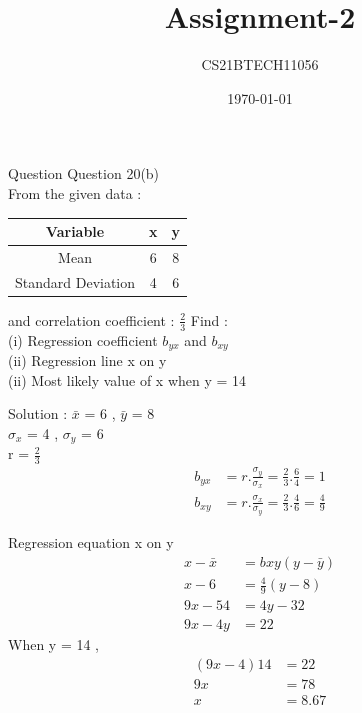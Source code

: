 \documentclass{beamer}
\title{Assignment-2}
\author{CS21BTECH11056}
\date{\today}
\begin{document}
\begin{frame}
    \titlepage 
\end{frame}

\logo{}


\begin{frame}{Question}
    \tableofcontents
    Question 20(b)\\
	From the given data :\\

\begin{table}[h!]
\center
{
\begin{tabular}{|c|c|c|}
\hline
Variable & x & y\\
\hline
Mean & 6 & 8\\
\hline
 Standard Deviation & 4 & 6\\
 \hline
\end{tabular}
}
\end{table}
and correlation coefficient : $\frac{2}{3}$  Find :\\
(i)	 Regression coefficient $ b_{yx} $ and $b_{xy}$\\
(ii) Regression line x on y\\
(ii) Most likely value of x when y = 14\\

\end{frame}


\begin{frame}{Solution :}
$\bar{x}$ = 6 , $\bar{y}$ = 8\\
$\sigma_{x}$ = 4 , $\sigma_{y}$ = 6\\ 
r = $\frac{2}{3}$\\
\begin{align}
b_{yx} &= r.\frac{\sigma_{y}}{\sigma_{x}}
        = \frac{2}{3}.\frac{6}{4}
        = 1\\
b_{xy} &= r.\frac{\sigma_{x}}{\sigma_{y}}
        = \frac{2}{3}.\frac{4}{6}
        = \frac{4}{9}
\end{align}

\end{frame}

\begin{frame}
Regression equation x on y\\
\begin{align*}
x - \bar{x} &= bxy( y -\bar{y} )\\
x - 6       &= \frac{4}{9} ( y - 8)\\
9x - 54     &= 4y - 32\\
9x - 4y     &= 22
\end{align*}
    When y = 14 ,
\begin{align*}
(9x - 4) 14 &= 22\\
         9x &= 78\\
          x &= 8.67
\end{align*}
\end{frame} 
\end{document}
